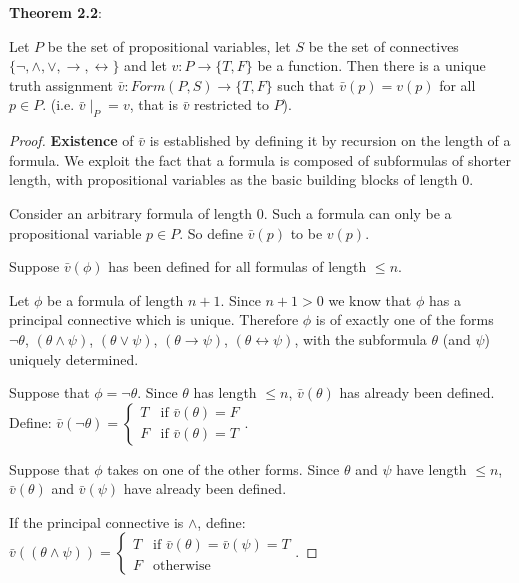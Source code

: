 \documentclass{article}
\theoremstyle{remark}\newtheorem{remark}{Remark}
\begin{document}
\textbf{Theorem 2.2}:

Let $P$ be the set of propositional variables, let $S$ be the set of connectives $\{ \neg, \land, \lor, \rightarrow, \leftrightarrow \}$ and let $v: P \longrightarrow \{ T, F \}$ be a function. Then there is a unique truth assignment $\bar{v}: Form(P, S) \longrightarrow \{ T, F \}$ such that $\bar{v}(p) = v(p)$ for all $p \in P$. (i.e. $\bar{v} \mid_{P} = v$, that is $\bar{v}$ restricted to $P$).

\begin{proof}
    \textbf{Existence} of $\bar{v}$ is established by defining it by recursion on the length of a formula. We exploit the fact that a formula is composed of subformulas of shorter length, with propositional variables as the basic building blocks of length 0.

    Consider an arbitrary formula of length 0. Such a formula can only be a propositional variable $p \in P$. So define $\bar{v}(p)$ to be $v(p)$.

    Suppose $\bar{v}(\phi)$ has been defined for all formulas of length $\leq n$.

    Let $\phi$ be a formula of length $n + 1$. Since $n + 1 > 0$ we know that $\phi$ has a principal connective which is unique. Therefore $\phi$ is of exactly one of the forms $\neg \theta$, $(\theta \land \psi)$, $(\theta \lor \psi)$, $(\theta \rightarrow \psi)$, $(\theta \leftrightarrow \psi)$, with the subformula $\theta$ (and $\psi$) uniquely determined.
    
    Suppose that $\phi = \neg \theta$. Since $\theta$ has length $\leq n$, $\bar{v}(\theta)$ has already been defined. Define:
    $\bar{v}(\neg \theta) = \begin{cases}
        T & \text{if }  \bar{v}(\theta) = F\\
        F & \text{if }  \bar{v}(\theta) = T
    \end{cases}$.
    
    Suppose that $\phi$ takes on one of the other forms. Since $\theta$ and $\psi$ have length $\leq n$, $\bar{v}(\theta)$ and $\bar{v}(\psi)$ have already been defined.
    
    If the principal connective is $\land$, define:
    $\bar{v}((\theta \land \psi)) = \begin{cases}
        T & \text{if }  \bar{v}(\theta) = \bar{v}(\psi) = T\\
        F & \text{otherwise}
    \end{cases}$.
    

\end{proof}
\end{document}
